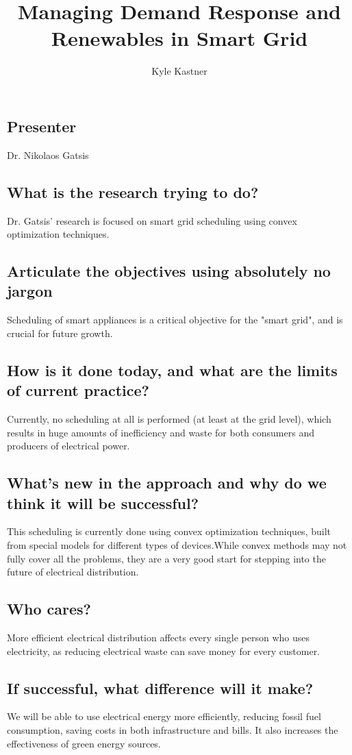 \documentclass[9pt]{article}
\begin{document}
\title{Managing Demand Response and Renewables in Smart Grid}
\author{Kyle Kastner}

\maketitle

\subsection*{Presenter}
Dr. Nikolaos Gatsis 
\subsection*{What is the research trying to do?}
Dr. Gatsis' research is focused on smart grid scheduling using convex optimization techniques.
\subsection*{Articulate the objectives using absolutely no jargon}
Scheduling of smart appliances is a critical objective for the "smart grid", and is crucial for future growth.
\subsection*{How is it done today, and what are the limits of current practice?}
Currently, no scheduling at all is performed (at least at the grid level), which results in 
huge amounts of inefficiency and waste for both consumers and producers of electrical power.
\subsection*{What's new in the approach and why do we think it will be successful?}
This scheduling is currently done using convex optimization techniques, built from special models
for different types of devices.While convex methods may not fully cover all the problems, they are
a very good start for stepping into the future of electrical distribution.
\subsection*{Who cares?}
More efficient electrical distribution affects every single person who uses electricity, as reducing electrical waste
can save money for every customer.
\subsection*{If successful, what difference will it make?}
We will be able to use electrical energy more efficiently, reducing fossil fuel consumption, saving 
costs in both infrastructure and bills. It also increases the effectiveness of green energy sources.
\end{document}
